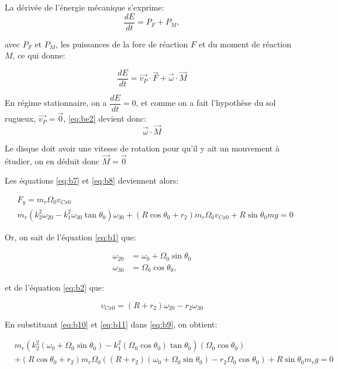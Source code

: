 La dérivée de l'énergie mécanique s'exprime: 
\begin{equation}
    \frac{dE}{dt}=P_F + P_M, 
    \label{eq:be1}
\end{equation}

avec $P_F$ et $P_M$, les puissances de la fore de réaction $F$ et du moment de réaction $M$, ce qui donne:

\begin{equation}
    \frac{dE}{dt}=\vec{v_P} \cdot \vec{F} + \vec{\omega} \cdot \vec{M}
    \label{eq:be2}
\end{equation}

En régime stationnaire, on a $\dfrac{dE}{dt}=0$, et comme on a fait l'hypothèse du sol rugueux, $\vec{v_P}=\vec{0}$, \ref{eq:be2} devient donc: $$\vec{\omega} \cdot \vec{M}$$

Le disque doit avoir une vitesse de rotation pour qu'il y ait un mouvement à étudier, on en déduit donc $\vec{M}=\vec{0}$

Les équations \ref{eq:b7} et \ref{eq:b8} deviennent alors:

\begin{align}
    &F_y=m_r \Omega_0 v_{Cx0} \nonumber\\
    &m_r(k_2^2\omega_{20}-k_1^2\omega_{30} \tan{\theta_0})\omega_{30} +(R\cos{\theta_0}+r_2)m_r \Omega_0 v_{Cx0} + R\sin{\theta_0}mg =0
  \label{eq:b9}
\end{align}

Or, on sait de l'équation \ref{eq:b1} que:

\begin{align}
    \omega_{20}&=\omega_0 + \Omega_0 \sin{\theta_0} \nonumber\\
    \omega_{30}&=\Omega_0 \cos{\theta_0},
  \label{eq:b10}
\end{align}

et de l'équation \ref{eq:b2} que:

\begin{equation}
    v_{Cx0}=(R+r_2)\omega_{20}-r_2\omega_{30}
    \label{eq:b10b}
\end{equation}

En substituant \ref{eq:b10} et \ref{eq:b11} dans \ref{eq:b9}, on obtient:

\begin{align}
     &m_r(k_2^2(\omega_0 + \Omega_0 \sin{\theta_0})-k_1^2(\Omega_0 \cos{\theta_0}) \tan{\theta_0})(\Omega_0 \cos{\theta_0})  \nonumber\\
    &+(R\cos{\theta_0}+r_2)m_r \Omega_0 ((R+r_2)(\omega_0 + \Omega_0 \sin{\theta_0})-r_2\Omega_0 \cos{\theta_0}) + R\sin{\theta_0}m_r g =0
  \label{eq:b11}
\end{align}

